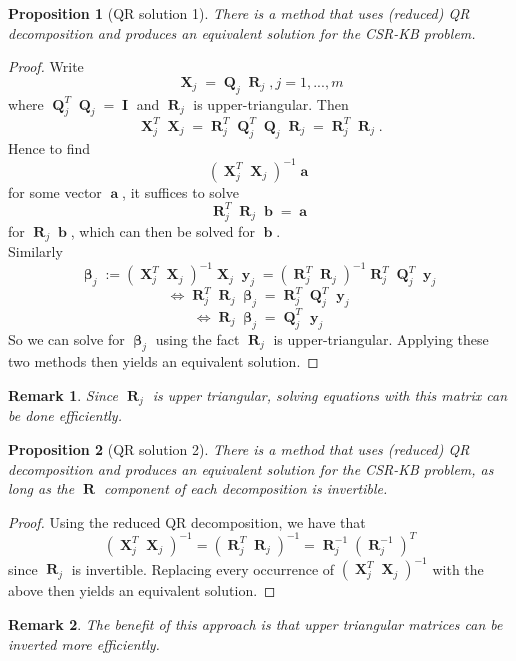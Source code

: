\documentclass[12pt]{article}
\DeclareMathOperator{\bb}{\mathbf{b}}
\DeclareMathOperator{\bX}{\mathbf{X}}
\DeclareMathOperator{\by}{\mathbf{y}}
\DeclareMathOperator{\bQ}{\mathbf{Q}}
\DeclareMathOperator{\bI}{\mathbf{I}}
\DeclareMathOperator{\bR}{\mathbf{R}}
\DeclareMathOperator{\ba}{\mathbf{a}}
\DeclareMathOperator{\bbeta}{\boldsymbol{\beta}}
\newtheorem{prop}{Proposition}
\newtheorem*{remark}{Remark}
\begin{document}
\begin{prop}[QR solution 1] There is a method that uses (reduced) QR decomposition and produces an equivalent solution for the CSR-KB problem.
\end{prop}
\begin{proof}
Write
$$\bX_j = \bQ_j \bR_j, j=1, ..., m$$
where $\bQ_j^T\bQ_j = \bI$ and $\bR_j$ is upper-triangular. Then
$$\bX_j^T \bX_j = \bR_j^T \bQ_j^T\bQ_j \bR_j = \bR_j^T\bR_j .$$
Hence to find 
$$(\bX_j^T \bX_j)^{-1} \ba$$
for some vector $\ba$, it suffices to solve
$$\bR_j^T \bR_j \bb = \ba$$
for $\bR_j \bb$, which can then be solved for $\bb$. \\
Similarly
$$\bbeta_j := (\bX_j^T \bX_j)^{-1} \bX_j \by_j = (\bR_j^T \bR_j)^{-1} \bR_j^T \bQ_j^T \by_j$$
$$\iff \bR_j^T \bR_j\bbeta_j = \bR_j^T \bQ_j^T \by_j$$
$$\iff \bR_j\bbeta_j = \bQ_j^T \by_j$$
So we can solve for $\bbeta_j$ using the fact $\bR_j$ is upper-triangular. Applying these two methods then yields an equivalent solution.
\end{proof}

\begin{remark}
Since $\bR_j$ is upper triangular, solving equations with this matrix can be done efficiently.
\end{remark}

\begin{prop}[QR solution 2] There is a method that uses (reduced) QR decomposition and produces an equivalent solution for the CSR-KB problem, as long as the $\bR$ component of each decomposition is invertible.
\end{prop}

\begin{proof}
Using the reduced QR decomposition, we have that 
$$(\bX_j^T \bX_j)^{-1} = (\bR_j^T \bR_j)^{-1} = \bR_j^{-1} (\bR_j^{-1})^T$$
since $\bR_j$ is invertible. Replacing every occurrence of $(\bX_j^T \bX_j)^{-1}$ with the above then yields an equivalent solution.
\end{proof}

\begin{remark}
The benefit of this approach is that upper triangular matrices can be inverted more efficiently.
\end{remark}
\end{document}

